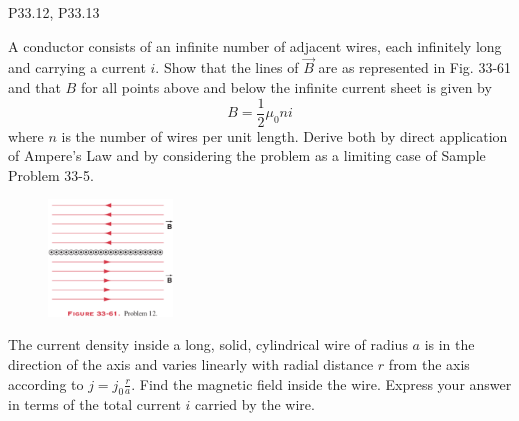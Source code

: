 \documentclass[11pt,letterpaper,boxed]{pset}
\begin{document}
    \begin{center}
        P33.12, P33.13
    \end{center}
    
    \begin{problem} [P33.12]
    A conductor consists of an infinite number of adjacent wires, each infinitely long and carrying a current $i$. Show that the lines of $\Vec{B}$ are as represented in Fig. 33-61 and that $B$ for all points above and below the infinite current sheet is given by \[B = \frac{1}{2}\mu_0ni\]
    where $n$ is the number of wires per unit length. Derive both by direct application of Ampere's Law and by considering the problem as a limiting case of Sample Problem 33-5.
    \end{problem}
    
    \begin{figure} [ht]
        \includegraphics[width=125px]{HW7Images/P33-12.png}
        \label{fig:P33-11}
    \end{figure}
    \newpage
    
    \begin{problem} [P33.13]
    The current density inside a long, solid, cylindrical wire of radius $a$ is in the direction of the axis and varies linearly with radial distance $r$ from the axis according to $j = j_0\frac{r}{a}$. Find the magnetic field inside the wire. Express your answer in terms of the total current $i$ carried by the wire.
    \end{problem}
    \newpage
\end{document}
